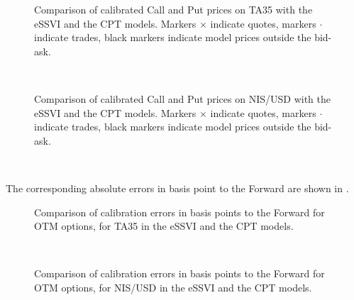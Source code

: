 \documentclass{article}
\begin{document}

    \begin{figure}
    	\caption{Comparison of calibrated Call and Put prices on TA35 with the eSSVI and the CPT models.
    		Markers $\times$ indicate quotes, markers $\cdot$ indicate trades, black markers indicate model prices outside the bid-ask.}
    	\label{figurePricesTA35}
    \end{figure}
    { \hspace*{\fill} \\}


    \begin{figure}
    	\caption{Comparison of calibrated Call and Put prices on NIS/USD with the eSSVI and the CPT models. Markers $\times$ indicate quotes, markers $\cdot$ indicate trades, black markers indicate model prices outside the bid-ask.}
    	\label{figurePricesNISUSD}
    \end{figure}
    { \hspace*{\fill} \\}

	The corresponding absolute errors in basis point to the Forward are
shown in .


    \begin{figure}
    	\caption{Comparison of calibration errors in basis points to the Forward for OTM options, for TA35 in the eSSVI and the CPT models.}
    	\label{figErrorTA35}
    \end{figure}
    { \hspace*{\fill} \\}


    \begin{figure}
    	\caption{Comparison of calibration errors in basis points to the Forward for OTM options, for NIS/USD in the eSSVI and the CPT models.}
    	\label{figErrorNISUSD}
    \end{figure}
    { \hspace*{\fill} \\}
\end{document}
